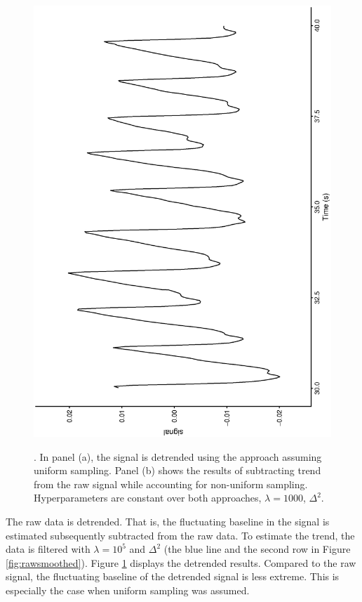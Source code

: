 \documentclass[twocolumn]{bmcart}%
\begin{document}
\begin{figure}[]
\begin{center}
{{				\includegraphics[angle=270, width=\linewidth]{detrended_ues_d2}
		}	%
}
\end{center}
	\caption{.  
	In panel (a), the signal is detrended using the approach assuming uniform sampling.	
	Panel (b) shows the results of subtracting trend from the raw signal while accounting for non-uniform sampling.
 	Hyperparameters are constant over both approaches, $\lambda = 1000$, $\Delta^2$.}
	\label{fig:detrendedplot}
\end{figure}

The raw data is detrended. That is, the fluctuating baseline in the signal is estimated subsequently subtracted from the raw data. 
To estimate the trend, the data is filtered with  $\lambda = 10^5$ and $\Delta ^2$ (the blue line and the second row in Figure \ref{fig:rawsmoothed}). 
Figure \ref{fig:detrendedplot} displays the detrended results. 
Compared to the raw signal, the fluctuating baseline of the detrended signal is less extreme. 
This is especially the case when uniform sampling was assumed. 
\end{document}
